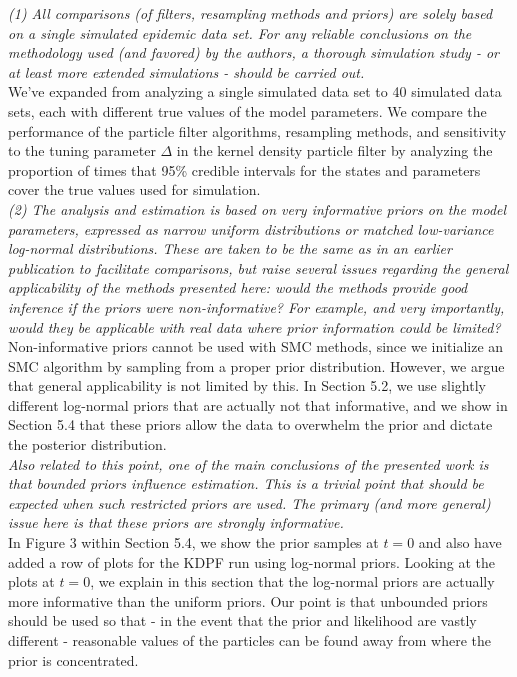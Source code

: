 \documentclass{article}
\begin{document}
\noindent \emph{(1) All comparisons (of filters, resampling methods and priors) are solely based on a single simulated epidemic data set. For any reliable conclusions on the methodology used (and favored) by the authors, a thorough simulation study - or at least more extended simulations - should be carried out.} \\

We've expanded from analyzing a single simulated data set to 40 simulated data sets, each with different true values of the model parameters. We compare the performance of the particle filter algorithms, resampling methods, and sensitivity to the tuning parameter $\Delta$ in the kernel density particle filter by analyzing the proportion of times that 95\% credible intervals for the states and parameters cover the true values used for simulation. \\

\noindent \emph{(2) The analysis and estimation is based on very informative priors on the model parameters, expressed as narrow uniform distributions or matched low-variance log-normal distributions. These are taken to be the same as in an earlier publication to facilitate comparisons, but raise several issues regarding the general applicability of the methods presented here: would the methods provide good inference if the priors were non-informative? For example, and very importantly, would they be applicable with real data where prior information could be limited?} \\

Non-informative priors cannot be used with SMC methods, since we initialize an SMC algorithm by sampling from a proper prior distribution. However, we argue that general applicability is not limited by this. In Section 5.2, we use slightly different log-normal priors that are actually not that informative, and we show in Section 5.4 that these priors allow the data to overwhelm the prior and dictate the posterior distribution. \\

\noindent \emph{Also related to this point, one of the main conclusions of the presented work is that bounded priors influence estimation. This is a trivial point that should be expected when such restricted priors are used. The primary (and more general) issue here is that these priors are strongly informative.} \\

In Figure 3 within Section 5.4, we show the prior samples at $t = 0$ and also have added a row of plots for the KDPF run using log-normal priors. Looking at the plots at $t = 0$, we explain in this section that the log-normal priors are actually more informative than the uniform priors. Our point is that unbounded priors should be used so that - in the event that the prior and likelihood are vastly different - reasonable values of the particles can be found away from where the prior is concentrated. \\
\end{document}
